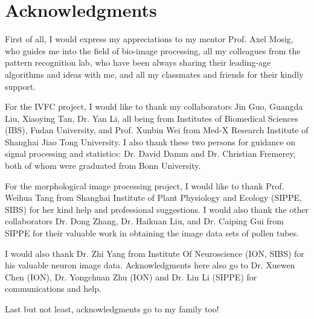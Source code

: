 
\chapter*{Acknowledgments}


First of all, I would express my appreciations to my mentor Prof. Axel Mosig, who guides me into the field of bio-image processing, all my colleagues from the pattern recognition lab, who have been always sharing their leading-age algorithms and ideas with me, and all my classmates and friends for their kindly support.

For the \ac{IVFC} project, I would like to thank my collaborators Jin Guo, Guangda Liu, Xiaoying Tan, Dr. Yan Li, all being from Institutes of Biomedical Sciences (IBS), Fudan University, and Prof. Xunbin Wei from Med-X Research Institute of Shanghai Jiao Tong University. I also thank these two persons for guidance on signal processing and statistics: Dr. David Damm and Dr. Christian Fremerey, both of whom were graduated from Bonn University.

For the morphological image processing project, I would like to thank Prof. Weihua Tang from Shanghai Institute of Plant Physiology and Ecology (SIPPE, SIBS) for her kind help and professional suggestions. I would also thank the other collaborators Dr. Dong Zhang, Dr. Haikuan Liu, and Dr. Caiping Gui from SIPPE for their valuable work in obtaining the image data sets of pollen tubes.

I would also thank Dr. Zhi Yang from Institute Of Neuroscience (ION, SIBS) for his valuable neuron image data. Acknowledgments here also go to Dr. Xuewen Chen (ION), Dr. Yongchuan Zhu (ION) and Dr. Lin Li (SIPPE) for communications and help.

Last but not least, acknowledgments go to my family too!



